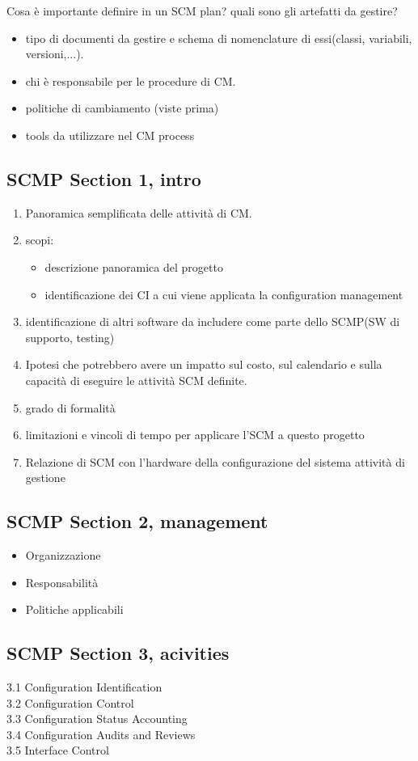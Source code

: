 \documentclass[10pt,a4paper]{book}
\begin{document}
Cosa è importante definire in un SCM plan? quali sono gli artefatti da gestire?
\begin{itemize}
\item tipo di documenti da gestire e schema di nomenclature di essi(classi, variabili, versioni,...).
\item chi è responsabile per le procedure di CM.
\item politiche di cambiamento (viste prima)
\item tools da utilizzare nel CM process
\end{itemize}

\subsection{SCMP Section 1, intro}
\begin{enumerate}
\item Panoramica semplificata delle attività di CM.
\item scopi:
	\begin{itemize}
		\item descrizione panoramica del progetto
		\item identificazione dei CI a cui viene applicata la configuration management
	\end{itemize}
\item identificazione di altri software da includere come parte dello SCMP(SW di supporto, testing)
\item Ipotesi che potrebbero avere un impatto sul costo, sul calendario e sulla capacità di eseguire le attività SCM definite.
\item grado di formalità
\item limitazioni e vincoli di tempo per applicare l'SCM a questo progetto
\item Relazione di SCM con l'hardware della configurazione del sistema attività di gestione
\end{enumerate}
\subsection{SCMP Section 2, management}
\begin{itemize}
\item Organizzazione
\item Responsabilità
\item Politiche applicabili
\end{itemize}
\subsection{SCMP Section 3, acivities}
3.1 Configuration Identification\\
3.2 Configuration Control\\
3.3 Configuration Status Accounting\\
3.4 Configuration Audits and Reviews\\
3.5 Interface Control\\
\end{document}
